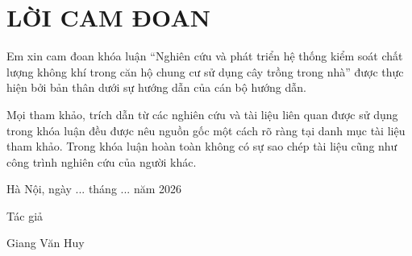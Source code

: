 \chapter*{LỜI CAM ĐOAN}
\fontsize{13}{15}\selectfont
Em xin cam đoan khóa luận ``Nghiên cứu và phát triển hệ thống kiểm soát chất lượng không khí trong căn hộ chung cư sử dụng cây trồng trong nhà'' được thực hiện bởi bản thân dưới sự hướng dẫn của cán bộ hướng dẫn.

Mọi tham khảo, trích dẫn từ các nghiên cứu và tài liệu liên quan được sử dụng trong khóa luận đều được nêu nguồn gốc một cách rõ ràng tại danh mục tài liệu tham khảo. Trong khóa luận hoàn toàn không có sự sao chép tài liệu cũng như công trình nghiên cứu của người khác.

\vspace{0.5cm}

\begin{flushright}
    Hà Nội, ngày ... tháng ... năm 2026 \par
    Tác giả\hspace*{2.8cm}\par
    \vspace{1.5cm}
    Giang Văn Huy \hspace*{1.4cm}
\end{flushright}
